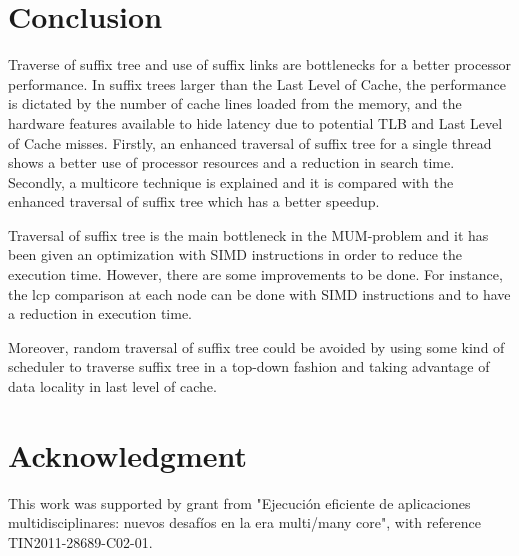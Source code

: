 \documentclass[conference]{IEEEtran}
\begin{document}
\section{Conclusion}
\label{conc}
Traverse of suffix tree and use of suffix links are bottlenecks for a better processor performance. In suffix trees larger than the Last Level of Cache, the performance is dictated by the number of cache lines loaded from the memory, and the hardware features available to hide latency due to potential TLB and Last Level of Cache misses. Firstly, an enhanced traversal of suffix tree for a single thread shows a better use of processor resources and a reduction in search time. Secondly, a multicore technique is explained and it is compared with the enhanced traversal of suffix tree which has a better speedup.

Traversal of suffix tree is the main bottleneck in the MUM-problem and it has been given an optimization with SIMD instructions in order to reduce the execution time. However, there are some improvements to be done. For instance, the lcp comparison at each node can be done with SIMD instructions and to have a reduction in execution time.

Moreover, random traversal of suffix tree could be avoided by using some kind of scheduler to traverse suffix tree in a top-down fashion and taking advantage of data locality in last level of cache.
\section*{Acknowledgment}
This work was supported by grant from "Ejecuci\'on eficiente de aplicaciones multidisciplinares: nuevos desaf\'ios en la era multi/many core", with reference TIN2011-28689-C02-01.




\end{document}
